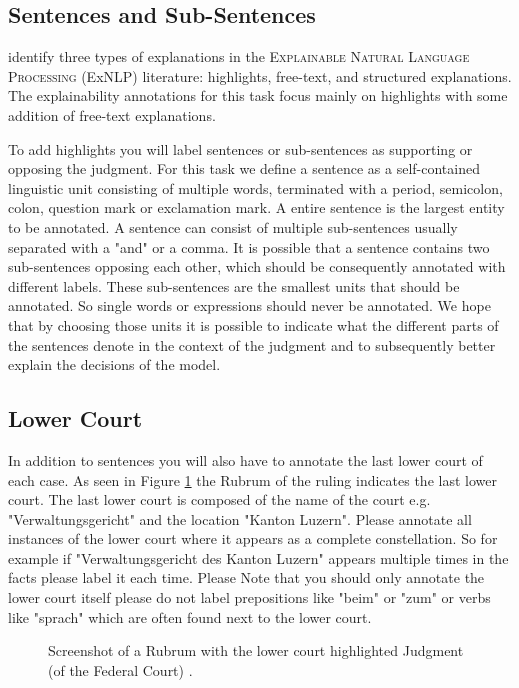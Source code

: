 \documentclass{article}
\begin{document}
\subsection{Sentences and Sub-Sentences}
\cite{TMTE_2021} identify three types of explanations in the \textsc{Explainable Natural Language Processing} (ExNLP) literature: highlights, free-text, and structured explanations. The explainability annotations for this task focus mainly on highlights with some addition of free-text explanations. 

To add highlights you will label sentences or sub-sentences as supporting or opposing the judgment. For this task we define a sentence as a self-contained linguistic unit consisting of multiple words, terminated with a period, semicolon, colon, question mark or exclamation mark. A entire sentence is the largest entity to be annotated. A sentence can consist of multiple sub-sentences usually separated with a "and" or a comma. It is possible that a sentence contains two sub-sentences opposing each other, which should be consequently annotated with different labels. These sub-sentences are the smallest units that should be annotated. So single words or expressions should never be annotated. We hope that by choosing those units it is possible to indicate what the different parts of the sentences denote in the context of the judgment and to subsequently better explain the decisions of the model.

\subsection{Lower Court}
In addition to sentences you will also have to annotate the last lower court of each case. As seen in Figure \ref{rubrum} the Rubrum of the ruling indicates the last lower court. The last lower court is composed of the name of the court e.g. "Verwaltungsgericht" and the location "Kanton Luzern". Please annotate all instances of the lower court where it appears as a complete constellation. So for example if "Verwaltungsgericht des Kanton Luzern" appears multiple times in the facts please label it each time. Please Note that you should only annotate the lower court itself please do not label prepositions like "beim" or "zum" or verbs like "sprach" which are often found next to the lower court.

\begin{figure}[H]
     \caption{Screenshot of a Rubrum with the lower court highlighted Judgment (of the Federal Court) \citeauthor{9C-424-2017}. }
     \label{rubrum}
\end{figure}
\end{document}
